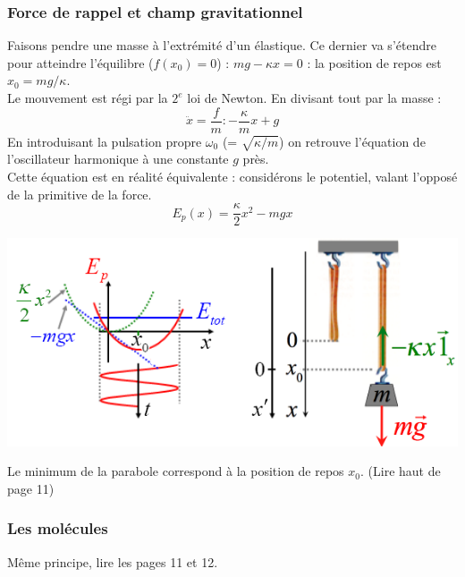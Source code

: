 \documentclass	[11pt, a4paper, openany]{book}
\begin{document}
	\subsubsection{Force de rappel et champ gravitationnel}
	Faisons pendre une masse à l'extrémité d'un élastique. Ce dernier va s'étendre pour atteindre l'équilibre ($f(x_0)=0$) : $mg - \kappa x = 0$ : la position de repos est $x_0 = mg/\kappa$.\\
	Le mouvement est régi par la $2^e$ loi de Newton. En divisant tout par la masse :
	\begin{equation}
		\ddot{x} = \frac{f}{m} : -\frac{\kappa}{m}x + g
	\end{equation}
	En introduisant la pulsation propre $\omega_0$ (= $\sqrt{\kappa/m}$) on retrouve l'équation de l'oscillateur harmonique à une constante $g$ près.\\
	
	Cette équation est en réalité équivalente : considérons le potentiel, valant l'opposé de la primitive de la force.
	\begin{equation}
		E_p(x) = \frac{\kappa}{2}x^2 - mgx
	\end{equation}
	\begin{center}
		\includegraphics[scale=0.45]{oo/image4.png}
	\end{center}
	Le minimum de la parabole correspond à la position de repos $x_0$.  (Lire haut de page 11)
	
	\subsubsection{Les molécules}
	Même principe, lire les pages 11 et 12.
	
\end{document}
